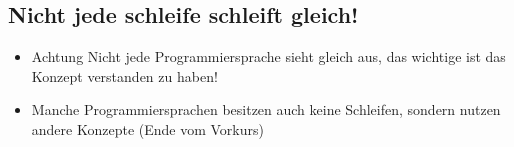 \livecoding

\subsection{Nicht jede schleife schleift gleich!}
\begin{frame}
    \slidehead

    \begin{itemize}
        \item \textcolor{TUDa-9b}{Achtung} Nicht jede Programmiersprache sieht gleich aus, das wichtige ist das Konzept verstanden zu haben!
        \item Manche Programmiersprachen besitzen auch keine Schleifen, sondern nutzen andere Konzepte (Ende vom Vorkurs)
    \end{itemize}
\end{frame}

